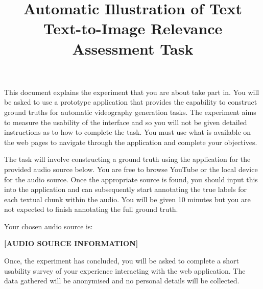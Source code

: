 \documentclass[]{article}
\title{\textbf{Automatic Illustration of Text}\\ \vspace{6mm}
    \Large Text-to-Image Relevance Assessment Task}
\date{}
\begin{document}
\maketitle
\noindent
This document explains the experiment that you are about take part in. You will be asked to use a prototype application that provides the capability to construct ground truths for automatic videography generation tasks. The experiment aims to measure the usability of the interface and so you will not be given detailed instructions as to how to complete the task. You must use what is available on the web pages to navigate through the application and complete your objectives.

\vspace{6mm}
\noindent
The task will involve constructing a ground truth using the application for the provided audio source below. You are free to browse YouTube or the local device for the audio source. Once the appropriate source is found, you should input this into the application and can subsequently start annotating the true labels for each textual chunk within the audio. You will be given 10 minutes but you are not expected to finish annotating the full ground truth.

\vspace{6mm}
\noindent
Your chosen audio source is: 

\begin{center}
    \textbf{[AUDIO SOURCE INFORMATION]}
\end{center}

\vspace{6mm}
\noindent
Once, the experiment has concluded, you will be asked to complete a short usability survey of your experience interacting with the web application. The data gathered will be anonymised and no personal details will be collected.
\end{document}
